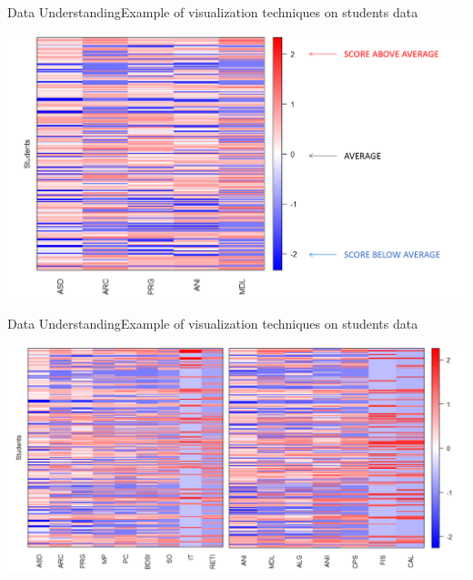 \begin{frame}{Data Understanding}{Example of visualization techniques on students data}

    \vspace{0.5cm}
    \noindent\begin{centering}
        \includegraphics[scale=0.25]{img3.png}
    \end{centering}

\end{frame}

\begin{frame}{Data Understanding}{Example of visualization techniques on students data}

    \vspace{0.5cm}
    \hspace*{-0.8cm}\includegraphics[scale=0.275]{img4.png}

\end{frame}